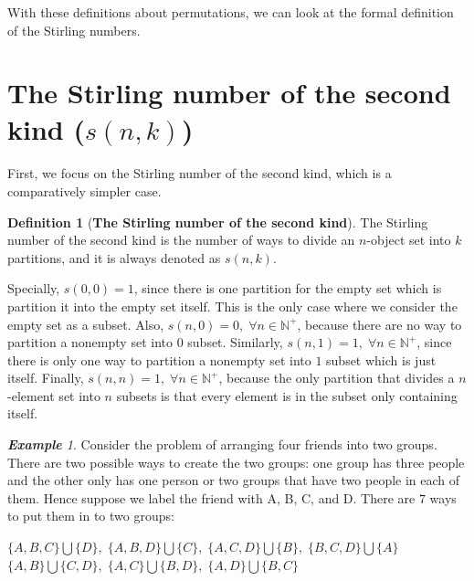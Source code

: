 \documentclass{article}
\theoremstyle{definition}
\newtheorem{definition}{Definition}[section]
\theoremstyle{remark}
\theoremstyle{example}
\newtheorem{example}{\textbf{Example}}[section]
\begin{document}
With these definitions about permutations, we can look at the formal definition of the Stirling numbers.


\section{The Stirling number of the second kind ($s(n,k)$)}
\paragraph{   }

First, we focus on the Stirling number of the second kind, which is a comparatively simpler case.

\begin{definition}[\textbf{The Stirling number of the second kind}]\label{def:SN2nd}
    The Stirling number of the second kind is the number of ways to divide an $n$-object set into $k$ partitions, and it is always denoted as $s(n,k)$.
\end{definition}

Specially, $s(0,0) = 1$, since there is one partition for the empty set which is partition it into the empty set itself. This is the only case where we consider the empty set as a subset. Also, $s(n,0) = 0, \; \forall n \in \mathbb{N^{+}}$, because there are no way to partition a nonempty set into $0$ subset. Similarly, $s(n,1) = 1, \; \forall n \in \mathbb{N^{+}}$, since there is only one way to partition a nonempty set into $1$ subset which is just itself. Finally, $s(n,n) = 1, \; \forall n \in \mathbb{N^{+}}$, because the only partition that divides a $n$-element set into $n$ subsets is that every element is in the subset only containing itself.

\begin{example}
    Consider the problem of arranging four friends into two groups. There are two possible ways to create the two groups: one group has three people and the other only has one person or two groups that have two people in each of them. Hence suppose we label the friend with A, B, C, and D. There are $7$ ways to put them in to two groups:
        \begin{center}
        $\{A,B,C\}\bigcup \{D\},\; \{A,B,D\}\bigcup\{C\},\; \{A,C,D\}\bigcup\{B\},\; \{B,C,D\}\bigcup\{A\}$\\
        $\{A,B\}\bigcup\{C,D\},\; \{A,C\}\bigcup\{B,D\},\;\{A,D\}\bigcup\{B,C\}$
        \end{center}
\end{example}
\end{document}
